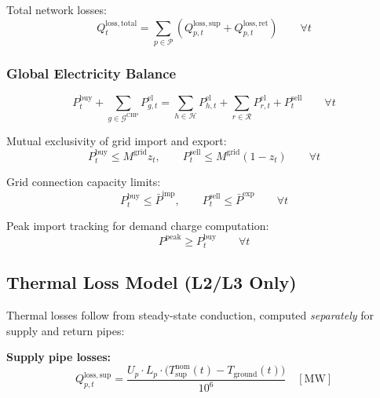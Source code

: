 \documentclass[review,3p]{elsarticle}
\begin{document}
Total network losses:
\begin{equation}
Q_t^{\mathrm{loss,total}} = \sum_{p \in \mathcal{P}} \left(
Q_{p,t}^{\mathrm{loss,sup}} + Q_{p,t}^{\mathrm{loss,ret}} \right)
\qquad \forall t
\label{eq:loss_total}
\end{equation}

\subsubsection{Global Electricity Balance}

\begin{equation}
P_t^{\mathrm{buy}} + \sum_{g \in \mathcal{G}^{\mathrm{CHP}}}
P_{g,t}^{\mathrm{el}}
= \sum_{h \in \mathcal{H}} P_{h,t}^{\mathrm{el}}
+ \sum_{r \in \mathcal{R}} P_{r,t}^{\mathrm{el}}
+ P_t^{\mathrm{sell}}
\qquad \forall t
\label{eq:balance_el}
\end{equation}

Mutual exclusivity of grid import and export:
\begin{equation}
P_t^{\mathrm{buy}} \leq M^{\mathrm{grid}} z_t, \qquad
P_t^{\mathrm{sell}} \leq M^{\mathrm{grid}} (1 - z_t)
\qquad \forall t
\label{eq:grid_bigm}
\end{equation}

Grid connection capacity limits:
\begin{equation}
P_t^{\mathrm{buy}} \leq \bar{P}^{\mathrm{imp}}, \qquad
P_t^{\mathrm{sell}} \leq \bar{P}^{\mathrm{exp}}
\qquad \forall t
\label{eq:grid_cap}
\end{equation}

Peak import tracking for demand charge computation:
\begin{equation}
P^{\mathrm{peak}} \geq P_t^{\mathrm{buy}} \qquad \forall t
\label{eq:peak}
\end{equation}

\subsection{Thermal Loss Model (L2/L3 Only)}
\label{sec:model_losses}

Thermal losses follow from steady-state conduction, computed
\emph{separately} for supply and return pipes:

\textbf{Supply pipe losses:}
\begin{equation}
Q_{p,t}^{\mathrm{loss,sup}} = \frac{U_p \cdot L_p \cdot
\big(T_{\mathrm{sup}}^{\mathrm{nom}}(t) - T_{\mathrm{ground}}(t)\big)}{10^6}
\quad [\mathrm{MW}]
\label{eq:loss_supply}
\end{equation}
\end{document}
